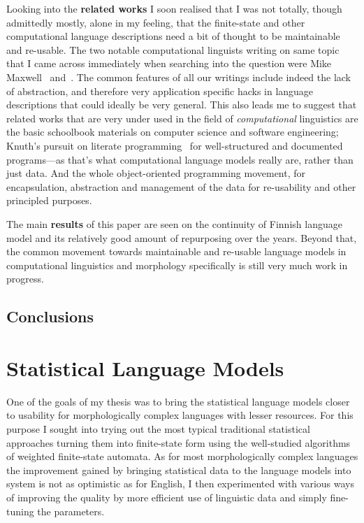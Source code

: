 \documentclass[officiallayout]{unihelcompling}
\begin{document}
Looking into the \textbf{related works} I soon realised that I was not totally,
though admittedly mostly, alone in my feeling, that the finite-state and other
computational language descriptions need a bit of thought to be maintainable
and re-usable. The two notable computational linguists writing on same topic
that I came across immediately when searching into the question were Mike
Maxwell~\citep{maxwell2008joint} and~\cite{wintner2008strengths}. The common
features of all our writings include indeed the lack of abstraction, and
therefore very application specific hacks in language descriptions that could
ideally be very general. This also leads me to suggest that related works that
are very under used in the field of \emph{computational} linguistics are the
basic schoolbook materials on computer science and software engineering;
Knuth's pursuit on literate programming~\citep{knuth1984literate} for
well-structured and documented programs---as that's what computational language
models really are, rather than just data. And the whole object-oriented
programming movement, for encapsulation, abstraction and management of the data
for re-usability and other principled purposes.

The main \textbf{results} of this paper are seen on the continuity of Finnish
language model and its relatively good amount of repurposing over the years.
Beyond that, the common movement towards maintainable and re-usable language
models in computational linguistics and morphology specifically is still very
much work in progress.

\section{Conclusions}



\chapter{Statistical Language Models}
\label{chap:statistical-models}

One of the goals of my thesis was to bring the statistical language models
closer to usability for morphologically complex languages with lesser
resources. For this purpose I sought into trying out the most typical
traditional statistical approaches turning them into finite-state form
using the well-studied algorithms of weighted finite-state automata. As for
most morphologically complex languages the improvement gained by bringing
statistical data to the language models into system is not as optimistic as
for English, I then experimented with various ways of improving the quality
by more efficient use of linguistic data and simply fine-tuning the parameters.
\end{document}
